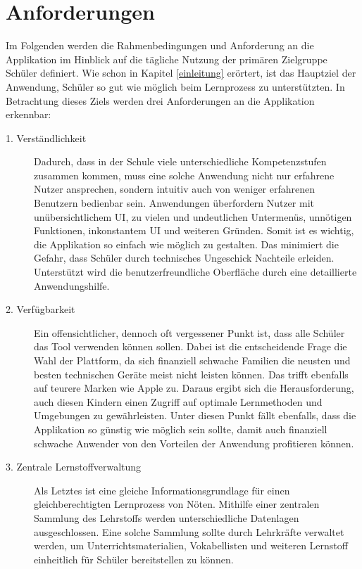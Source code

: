 \section{Anforderungen}
\label{section:rahmenbedingungen}
Im Folgenden werden die Rahmenbedingungen und Anforderung an die Applikation im Hinblick auf die tägliche Nutzung der primären Zielgruppe Schüler definiert. Wie schon in Kapitel \ref{einleitung} erörtert, ist das Hauptziel der Anwendung, Schüler so gut wie möglich beim Lernprozess zu unterstützten. In Betrachtung dieses Ziels werden drei Anforderungen an die Applikation erkennbar:
\begin{description}
\item[1. Verständlichkeit]
Dadurch, dass in der Schule viele unterschiedliche Kompetenzstufen zusammen kommen, muss eine solche Anwendung nicht nur erfahrene Nutzer ansprechen, sondern intuitiv auch von weniger erfahrenen Benutzern bedienbar sein. Anwendungen überfordern Nutzer mit unübersichtlichem UI, zu vielen und undeutlichen Untermenüs, unnötigen Funktionen, inkonstantem UI und weiteren Gründen. Somit ist es wichtig, die Applikation so einfach wie möglich zu gestalten. Das minimiert die Gefahr, dass Schüler durch technisches Ungeschick Nachteile erleiden. Unterstützt wird die benutzerfreundliche Oberfläche durch eine detaillierte Anwendungshilfe.
\item[2. Verfügbarkeit]
Ein offensichtlicher, dennoch oft vergessener Punkt ist, dass alle Schüler das Tool verwenden können sollen. Dabei ist die entscheidende Frage die Wahl der Plattform, da sich finanziell schwache Familien die neusten und besten technischen Geräte meist nicht leisten können. Das trifft ebenfalls auf teurere Marken wie Apple zu. Daraus ergibt sich die Herausforderung, auch diesen Kindern einen Zugriff auf optimale Lernmethoden und Umgebungen zu gewährleisten. Unter diesen Punkt fällt ebenfalls, dass die Applikation so günstig wie möglich sein sollte, damit auch finanziell schwache Anwender von den Vorteilen der Anwendung profitieren können.
\item[3. Zentrale Lernstoffverwaltung]
Als Letztes ist eine gleiche Informationsgrundlage für einen gleichberechtigten Lernprozess von Nöten. Mithilfe einer zentralen Sammlung des Lehrstoffs werden unterschiedliche Datenlagen ausgeschlossen. Eine solche Sammlung sollte durch Lehrkräfte verwaltet werden, um Unterrichtsmaterialien, Vokabellisten und weiteren Lernstoff einheitlich für Schüler bereitstellen zu können.
\end{description}


